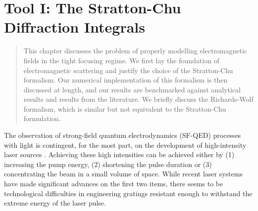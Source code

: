 \documentclass[11pt,SymmetricalJury]{inrsthesis/inrsthesis}
\newenvironment{chaptersummary}{%
  \begin{quotation}
  \SingleSpacing
  \setlength{\parskip}{\baselineskip}}{%
  \end{quotation}}
\begin{document}

\chapter{Tool I: The Stratton-Chu Diffraction Integrals}
\label{chapter:stratton-chu}

\begin{chaptersummary}
This chapter discusses the problem of properly modelling electromagnetic fields
in the tight focusing regime. We first lay the foundation of electromagnetic
scattering and justify the choice of the Stratton-Chu formalism. Our numerical
implementation of this formalism is then discussed at length, and our results
are benchmarked against analytical results and results from the literature.
We briefly discuss the Richards-Wolf formalism, which is similar but not equivalent
to the Stratton-Chu formulation.
\end{chaptersummary}

The observation of strong-field quantum electrodynamics (SF-QED) processes with light
is contingent, for the most part, on the development of high-intensity laser sources \cite{DiPiazza2012}. Achieving
these high intensities can be achieved either by (1) increasing the pump energy,
(2) shortening the pulse duration or (3) concentrating the beam in a small volume of space.
While recent laser systems have made significant advances on the first two items, there seems
to be technological difficulties in engineering gratings resistant enough to withstand the extreme
energy of the laser pulse.
\end{document}

